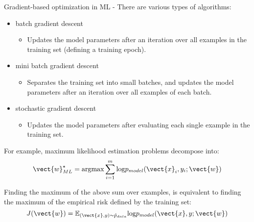 \begin{frame}[t,allowframebreaks]{
    Gradient-based optimization in ML -}
    There are various types of algorithms:\\
    \begin{itemize}
        \item   
            \Gls{batch gradient descent}\\
            \begin{itemize}
                \item
                    Updates the model parameters 
                    after an iteration over all examples in the training set
                    (defining a training \gls{epoch}).
            \end{itemize}
        \item 
            \Gls{mini batch gradient descent}\\
            \begin{itemize}
                \item   
                    Separates the training set into small batches,
                    and updates the model parameters after an iteration
                    over all examples of each batch.
            \end{itemize}
        \item 
            \Gls{stochastic gradient descent}\\
            \begin{itemize}
                \item   
                    Updates the model parameters after evaluating each
                    single example in the training set.\\
            \end{itemize}
    \end{itemize}

    \framebreak


    For example,
    \gls{maximum likelihood estimation}
    problems decompose into:
    \begin{equation}
        \vect{w}^{\star}_{ML} = \mathrm{argmax} 
            \sum_{i=1}^{m} \text{log}p_{model}(\vect{x}_{i},y_{i};\vect{w})
    \end{equation}

    Finding the maximum of the above sum over examples, 
    is equivalent to finding the maximum
    of the \gls{empirical risk}
    defined by the \gls{training set}:
    \begin{equation}
        J(\vect{w}) = 
          \mathbb{E}_{(\vect{x},y){\sim}\hat{p}_{data}}
          \text{log}p_{model}(\vect{x},y;\vect{w})
    \end{equation}


\end{frame}
